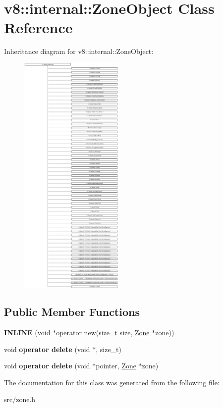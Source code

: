 \hypertarget{classv8_1_1internal_1_1_zone_object}{}\section{v8\+:\+:internal\+:\+:Zone\+Object Class Reference}
\label{classv8_1_1internal_1_1_zone_object}
Inheritance diagram for v8\+:\+:internal\+:\+:Zone\+Object\+:\begin{figure}[H]
\begin{center}
\leavevmode
\includegraphics[height=12.000000cm]{classv8_1_1internal_1_1_zone_object}
\end{center}
\end{figure}
\subsection*{Public Member Functions}
\begin{DoxyCompactItemize}
\item 
\hypertarget{classv8_1_1internal_1_1_zone_object_ab7ed5718d33857d606ad80f37be774e7}{}{\bfseries I\+N\+L\+I\+N\+E} (void $\ast$operator new(size\+\_\+t size, \hyperlink{classv8_1_1internal_1_1_zone}{Zone} $\ast$zone))\label{classv8_1_1internal_1_1_zone_object_ab7ed5718d33857d606ad80f37be774e7}

\item 
\hypertarget{classv8_1_1internal_1_1_zone_object_a7cdf166da84374e44eb3558851a17a1b}{}void {\bfseries operator delete} (void $\ast$, size\+\_\+t)\label{classv8_1_1internal_1_1_zone_object_a7cdf166da84374e44eb3558851a17a1b}

\item 
\hypertarget{classv8_1_1internal_1_1_zone_object_a4c1850e80517169980d997db7e81a26b}{}void {\bfseries operator delete} (void $\ast$pointer, \hyperlink{classv8_1_1internal_1_1_zone}{Zone} $\ast$zone)\label{classv8_1_1internal_1_1_zone_object_a4c1850e80517169980d997db7e81a26b}

\end{DoxyCompactItemize}


The documentation for this class was generated from the following file\+:\begin{DoxyCompactItemize}
\item 
src/zone.\+h\end{DoxyCompactItemize}
